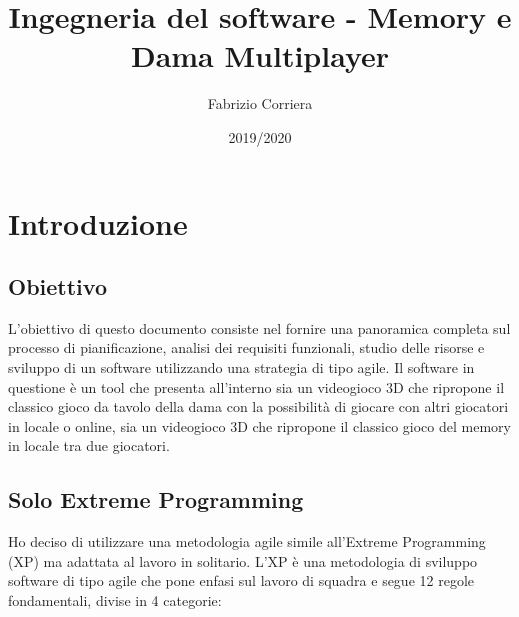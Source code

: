 \documentclass[12pt]{article}
\title{Ingegneria del software - Memory e Dama Multiplayer}
\author{Fabrizio Corriera}
\date{2019/2020}
\begin{document}
\maketitle
\thispagestyle{empty}
\newpage
{}
\tableofcontents
\newpage
{}

\section{Introduzione}

\subsection{Obiettivo}
L'obiettivo di questo documento consiste nel fornire una panoramica completa sul processo di pianificazione, analisi dei requisiti funzionali, studio delle risorse e sviluppo di un software utilizzando una strategia di tipo agile.
Il software in questione è un tool che presenta all'interno sia un videogioco 3D che ripropone il classico gioco da tavolo della dama con la possibilità di giocare con altri giocatori in locale o online, sia un videogioco 3D che ripropone il classico gioco del memory in locale tra due giocatori.

\subsection{Solo Extreme Programming}
Ho deciso di utilizzare una metodologia agile simile all'Extreme Programming (XP) ma adattata al lavoro in solitario.
L'XP è una metodologia di sviluppo software di tipo agile che pone enfasi sul lavoro di squadra e segue 12 regole fondamentali, divise in 4 categorie:
\end{document}
